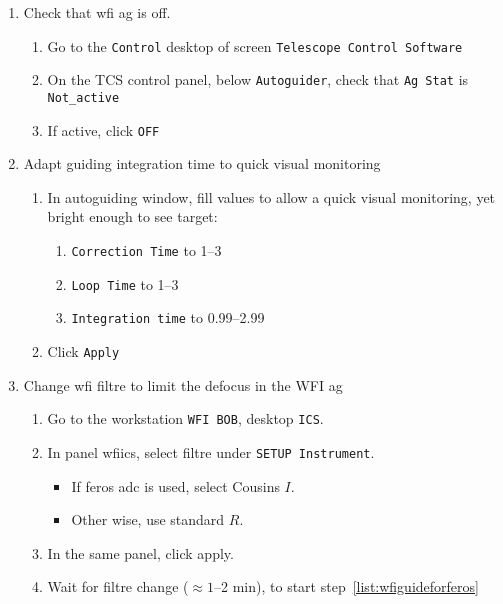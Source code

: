 \documentclass[11pt,fleqn,a4paper]{book}
\begin{document}
\label{proc:guideferoswfi}
\begin{enumerate}
    \item Check that \gls{wfi} \gls{ag} is off.
    \begin{enumerate}
        \item Go to the \texttt{Control} \gls{desktop} of screen \texttt{Telescope Control Software}
        \item On the \gls{TCS control panel}, below \texttt{Autoguider}, check that \texttt{Ag Stat} is \texttt{Not\_active}
        \item If active, click \texttt{OFF} 
    \end{enumerate}
    \item Adapt guiding integration time to quick visual monitoring
    \begin{enumerate}
        \item In \gls{autoguiding} window, fill values to allow a quick visual monitoring, yet bright enough to see target:
            \begin{enumerate}
                \item \texttt{Correction Time} to 1--3
                \item \texttt{Loop Time} to 1--3
                \item \texttt{Integration time} to 0.99--2.99
            \end{enumerate}
        \item Click \texttt{Apply}
    \end{enumerate}
    \item Change \gls{wfi} filtre to limit the defocus in the WFI \gls{ag}
    \begin{enumerate}
        \item Go to the workstation \texttt{WFI BOB}, \gls{desktop} \texttt{ICS}.
        \item In panel \gls{wfiics}, select filtre under \texttt{SETUP Instrument}.
        \begin{itemize}
            \item If \gls{feros} \gls{adc} is used, select Cousins $I$.
            \item Other wise, use standard $R$.
        \end{itemize}
        \item In the same panel, click apply.
        \item Wait for filtre change ($\approx 1$--2 min), to start step~\ref{list:wfiguideforferos}

\end{enumerate}
\end{enumerate}
\end{document}
